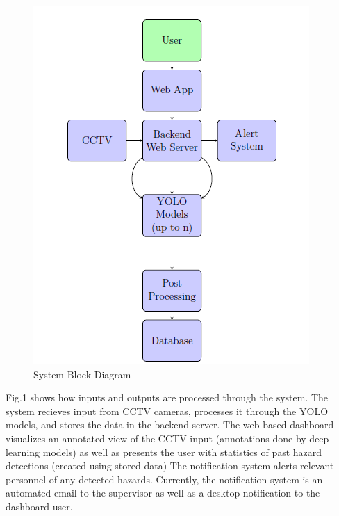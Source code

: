 \documentclass[12pt]{article}
\begin{document}
\begin{figure}[h]
    \centering
    \includegraphics[scale = 0.8]{system_block.png}
    \caption{System Block Diagram}
\end{figure}
Fig.1  shows how inputs and outputs are processed through the system.
The system recieves input from CCTV cameras, processes it through the YOLO models, 
and stores the data in the backend server. The web-based dashboard visualizes an annotated
view of the CCTV input (annotations done by deep learning models) as well as
presents the user with statistics of past hazard detections (created using stored data) 
The notification system alerts relevant personnel of any detected hazards. Currently, the notification system is an automated
email to the supervisor as well as a desktop notification to the dashboard user.
\end{document}
